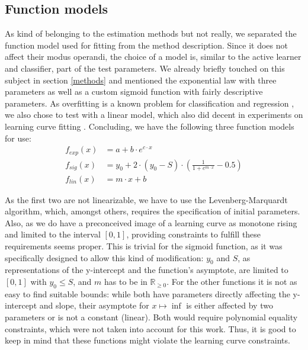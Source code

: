 \subsection{Function models}

As kind of belonging to the estimation methods but not really, we separated the function model used for fitting from the method description. Since it does not affect their modus operandi, the choice of a model is, similar to the active learner and classifier, part of the test parameters. We already briefly touched on this subject in section \ref{methods} and mentioned the exponential law with three parameters as well as a custom sigmoid function with fairly descriptive parameters. As overfitting is a known problem for classification and regression \cite{Dietterich1995}, we also chose to test with a linear model, which also did decent in experiments on learning curve fitting \cite{FigueroaEtal2012}. Concluding, we have the following three function models for use:
\begin{subequations}
	\begin{align}
	f_{exp}(x) &= a + b \cdot e^{c \cdot x} \\
	f_{sig}(x) &= y_0 + 2 \cdot (y_0 - S) \cdot \left( \frac{1}{1+e^{m \cdot x}} - 0.5 \right) \\
	f_{lin}(x) &= m \cdot x + b
	\end{align}
\end{subequations}

As the first two are not linearizable, we have to use the Levenberg-Marquardt algorithm, which, amongst others, requires the specification of initial parameters. Also, as we do have a preconceived image of a learning curve as monotone rising and limited to the interval $[0, 1]$, providing constraints to fulfill these requirements seems proper. This is trivial for the sigmoid function, as it was specifically designed to allow this kind of modification: $y_0$ and $S$, as representations of the y-intercept and the function's asymptote, are limited to $[0,1]$ with $y_0 \leq S$, and $m$ has to be in $\mathbb{R}_{\geq 0}$. For the other functions it is not as easy to find suitable bounds: while both have parameters directly affecting the y-intercept and slope, their asymptote for $x \mapsto \inf$ is either affected by two parameters or is not a constant (linear). Both would require polynomial equality constraints, which were not taken into account for this work. Thus, it is good to keep in mind that these functions might violate the learning curve constraints.


